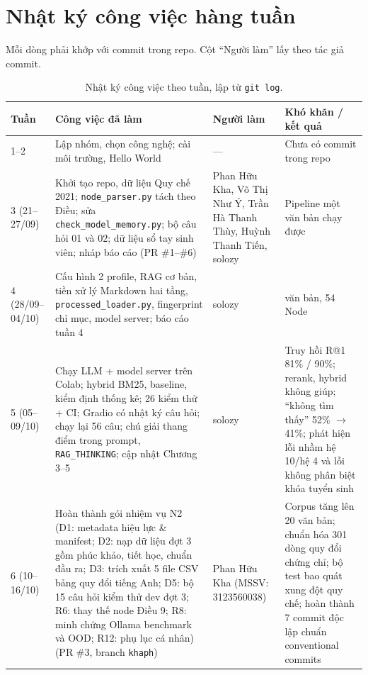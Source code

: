 \chapter{Nhật ký công việc hàng tuần}
\label{app:nhat-ky}

Mỗi dòng phải khớp với commit trong repo. Cột ``Người làm'' lấy theo tác giả commit.

\begin{table}[H]
  \centering
  \small
  \begin{tabularx}{\textwidth}{p{1.7cm} >{\hsize=1.1\hsize}X p{1.6cm} >{\hsize=0.9\hsize}X}
    \toprule
    \textbf{Tuần} & \textbf{Công việc đã làm} & \textbf{Người làm} & \textbf{Khó khăn / kết quả} \\
    \midrule
    1--2 & Lập nhóm, chọn công nghệ; cài môi trường, Hello World & --- & Chưa có commit trong repo \\
    3 (21--27/09) & Khởi tạo repo, dữ liệu Quy chế 2021; \texttt{node\_parser.py} tách theo Điều; sửa \texttt{check\_model\_memory.py}; bộ câu hỏi 01 và 02; dữ liệu sổ tay sinh viên; nháp báo cáo (PR \#1--\#6) & Phan Hữu Kha, Võ Thị Như Ý, Trần Hà Thanh Thùy, Huỳnh Thanh Tiến, solozy & Pipeline một văn bản chạy được \\
    4 (28/09--04/10) & Cấu hình 2 profile, RAG cơ bản, tiền xử lý Markdown hai tầng, \texttt{processed\_loader.py}, fingerprint chỉ mục, model server; báo cáo tuần 4 & solozy & 6 văn bản, 54 Node \\
    5 \newline (05--09/10) &
      Chạy LLM + model server trên Colab; hybrid BM25, baseline, kiểm định thống kê; 26 kiểm thử + CI;
      Gradio có nhật ký câu hỏi; chạy lại 56 câu; chú giải thang điểm trong prompt, \texttt{RAG\_THINKING};
      cập nhật Chương 3--5 &
      solozy &
      Truy hồi R@1 81\% / 90\%; rerank, hybrid không giúp; ``không tìm thấy'' 52\% $\to$ 41\%;
      phát hiện lỗi nhầm hệ 10/hệ 4 và lỗi không phân biệt khóa tuyển sinh \\
    \midrule
    6 \newline (10--16/10) &
      Hoàn thành gói nhiệm vụ N2 (D1: metadata hiệu lực \& manifest; D2: nạp dữ liệu đợt 3 gồm phúc khảo, tiết học, chuẩn đầu ra; D3: trích xuất 5 file CSV bảng quy đổi tiếng Anh; D5: bộ 15 câu hỏi kiểm thử dev đợt 3; R6: thay thế node Điều 9; R8: minh chứng Ollama benchmark và OOD; R12: phụ lục cá nhân) (PR \#3, branch \texttt{khaph}) &
      Phan Hữu Kha \newline (MSSV: 3123560038) &
      Corpus tăng lên 20 văn bản; chuẩn hóa 301 dòng quy đổi chứng chỉ; bộ test bao quát xung đột quy chế; hoàn thành 7 commit độc lập chuẩn conventional commits \\
    \bottomrule
  \end{tabularx}
  \caption{Nhật ký công việc theo tuần, lập từ \texttt{git log}.}
  \label{tab:nhat-ky-tuan}
\end{table}

